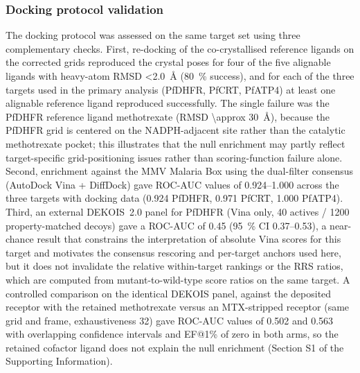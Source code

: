 \documentclass[11pt,a4paper]{article}
\begin{document}
	\subsubsection{Docking protocol validation}\label{sec:methods_dock_val}
	The docking protocol was assessed on the same target set using three complementary checks. First, re-docking of the co-crystallised reference ligands on the corrected grids reproduced the crystal poses for four of the five alignable ligands with heavy-atom RMSD \qty{<2.0}{\angstrom} (\qty{80}{\percent} success), and for each of the three targets used in the primary analysis (PfDHFR, PfCRT, PfATP4) at least one alignable reference ligand reproduced successfully. The single failure was the PfDHFR reference ligand methotrexate (RMSD \qty{\approx 30}{\angstrom}), because the PfDHFR grid is centered on the NADPH-adjacent site rather than the catalytic methotrexate pocket; this illustrates that the null enrichment may partly reflect target-specific grid-positioning issues rather than scoring-function failure alone. Second, enrichment against the MMV Malaria Box using the dual-filter consensus (AutoDock Vina + DiffDock) gave ROC-AUC values of \numrange{0.924}{1.000} across the three targets with docking data (\num{0.924} PfDHFR, \num{0.971} PfCRT, \num{1.000} PfATP4). Third, an external DEKOIS~2.0 panel for PfDHFR (Vina only, \num{40} actives / \num{1200} property-matched decoys) gave a ROC-AUC of \num{0.45} (\qty{95}{\percent} CI \numrange{0.37}{0.53}), a near-chance result that constrains the interpretation of absolute Vina scores for this target and motivates the consensus rescoring and per-target anchors used here, but it does not invalidate the relative within-target rankings or the RRS ratios, which are computed from mutant-to-wild-type score ratios on the same target. A controlled comparison on the identical DEKOIS panel, against the deposited receptor with the retained methotrexate versus an MTX-stripped receptor (same grid and frame, exhaustiveness \num{32}) gave ROC-AUC values of \num{0.502} and \num{0.563} with overlapping confidence intervals and EF@1\% of zero in both arms, so the retained cofactor ligand does not explain the null enrichment (Section S1 of the Supporting Information).
	
\end{document}
